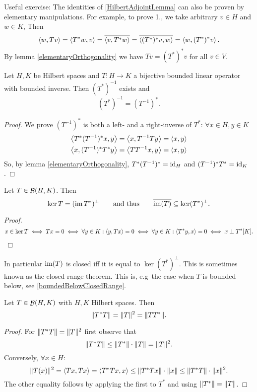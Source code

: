 \begin{note}
Useful exercise: The identities of \ref{HilbertAdjointLemma} can also be proven by elementary manipulations. For example, to prove 1., we take arbitrary $v\in H$ and $w\in K$, Then
\[ \left\langle w,Tv \right\rangle = \left\langle T^*w,v \right\rangle = \overline{\left\langle v,T^*w \right\rangle} = \overline{\left\langle (T^*)^*v,w \right\rangle} = \left\langle w, (T^*)^*v \right\rangle. \]
By lemma \ref{elementaryOrthogonality} we have $Tv = (T^*)^*v$ for all $v\in V$. 
\end{note}

\begin{proposition}
Let $H,K$ be Hilbert spaces and $T:H\to K$ a bijective bounded linear operator with bounded inverse. Then $(T^*)^{-1}$ exists and
\[ (T^*)^{-1} = (T^{-1})^*. \]
\end{proposition}
\begin{proof}
We prove $(T^{-1})^*$ is both a left- and a right-inverse of $T^*$: $\forall x\in H, y\in K$
\begin{align*}
\left\langle T^*(T^{-1})^*x,y \right\rangle &= \left\langle x,T^{-1}Ty \right\rangle = \left\langle x,y \right\rangle \\
\left\langle x,(T^{-1})^*T^*y \right\rangle &= \left\langle TT^{-1}x,y \right\rangle = \left\langle x,y \right\rangle
\end{align*}
So, by lemma \ref{elementaryOrthogonality}, $T^*(T^{-1})^* = \operatorname{id}_H$ and $(T^{-1})^*T^* = \operatorname{id}_K$.
\end{proof}

\begin{proposition}
Let $T\in\mathop{\mathcal{B}}(H,K)$. Then
\[ \ker T = (\operatorname{im} T^*)^\perp \qquad \text{and thus} \qquad \overline{\operatorname{im}(T)} \subseteq \ker(T^*)^\perp. \]
\end{proposition}
\begin{proof}
\[ x\in \ker T \iff Tx = 0 \iff \forall y\in K: \left\langle y, Tx \right\rangle=0 \iff \forall y\in K: \left\langle T^*y, x \right\rangle=0 \iff x\perp T^*[K]. \]
\end{proof}
In particular $\operatorname{im}(T)$ is closed iff it is equal to $\ker(T^*)^\perp$. This is sometimes known as the closed range theorem. This is, e.g\, the case when $T$ is bounded below, see \ref{boundedBelowClosedRange}.

\begin{proposition} \label{normOfSquare}
Let $T\in \mathop{\mathcal{B}}(H,K)$ with $H,K$ Hilbert spaces. Then
\[ \lVert T^*T\rVert= \lVert T\rVert^2 = \lVert TT^*\rVert. \]
\end{proposition}
\begin{proof}
For $\lVert T^*T\rVert= \lVert T\rVert^2$ first observe that
\[ \lVert T^*T\rVert \leq \lVert T^*\rVert\cdot\lVert T\rVert = \lVert T\rVert^2. \]
Conversely, $\forall x\in H$:
\[ \lVert T(x)\rVert^2 = \left\langle Tx,Tx \right\rangle = \left\langle T^*Tx,x \right\rangle \leq \lVert T^*Tx\rVert\cdot \lVert x\rVert \leq \lVert T^*T\rVert\cdot\lVert x\rVert^2. \]
The other equality follows by applying the first to $T^*$ and using $\lVert T^*\rVert=\lVert T\rVert$.
\end{proof}

